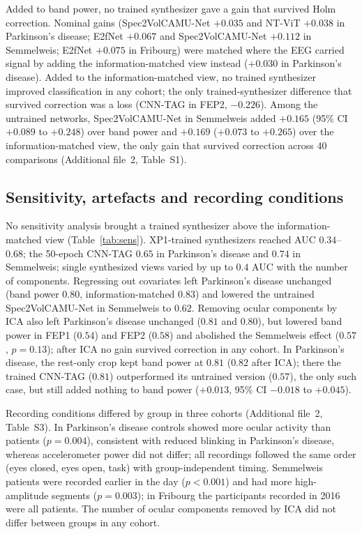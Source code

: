 \documentclass[pdflatex,referee,sn-basic]{sn-jnl}%
\begin{document}
Added to band power, no trained synthesizer gave a gain that survived Holm correction. Nominal gains (Spec2VolCAMU-Net $+0.035$ and NT-ViT $+0.038$ in Parkinson's disease; E2fNet $+0.067$ and Spec2VolCAMU-Net $+0.112$ in Semmelweis; E2fNet $+0.075$ in Fribourg) were matched where the EEG carried signal by adding the information-matched view instead ($+0.030$ in Parkinson's disease). Added to the information-matched view, no trained synthesizer improved classification in any cohort; the only trained-synthesizer difference that survived correction was a loss (CNN-TAG in FEP2, $-0.226$). Among the untrained networks, Spec2VolCAMU-Net in Semmelweis added $+0.165$ (95\% CI $+0.089$ to $+0.248$) over band power and $+0.169$ ($+0.073$ to $+0.265$) over the information-matched view, the only gain that survived correction across 40 comparisons (Additional file~2, Table~S1).

\subsection{Sensitivity, artefacts and recording conditions}\label{section:res_sens}

No sensitivity analysis brought a trained synthesizer above the information-matched view (Table~\ref{tab:sens}). XP1-trained synthesizers reached AUC $0.34$--$0.68$; the 50-epoch CNN-TAG $0.65$ in Parkinson's disease and $0.74$ in Semmelweis; single synthesized views varied by up to $0.4$ AUC with the number of components. Regressing out covariates left Parkinson's disease unchanged (band power $0.80$, information-matched $0.83$) and lowered the untrained Spec2VolCAMU-Net in Semmelweis to $0.62$. Removing ocular components by ICA also left Parkinson's disease unchanged ($0.81$ and $0.80$), but lowered band power in FEP1 ($0.54$) and FEP2 ($0.58$) and abolished the Semmelweis effect ($0.57$, $p=0.13$); after ICA no gain survived correction in any cohort. In Parkinson's disease, the rest-only crop kept band power at $0.81$ ($0.82$ after ICA); there the trained CNN-TAG ($0.81$) outperformed its untrained version ($0.57$), the only such case, but still added nothing to band power ($+0.013$, 95\% CI $-0.018$ to $+0.045$).

Recording conditions differed by group in three cohorts (Additional file~2, Table~S3). In Parkinson's disease controls showed more ocular activity than patients ($p=0.004$), consistent with reduced blinking in Parkinson's disease, whereas accelerometer power did not differ; all recordings followed the same order (eyes closed, eyes open, task) with group-independent timing. Semmelweis patients were recorded earlier in the day ($p<0.001$) and had more high-amplitude segments ($p=0.003$); in Fribourg the participants recorded in 2016 were all patients. The number of ocular components removed by ICA did not differ between groups in any cohort.
\end{document}
